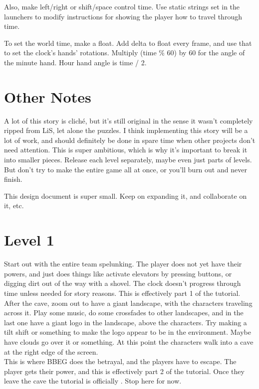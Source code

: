 \documentclass[a4paper,12pt]{article}
\begin{document}
  Also, make left/right or shift/space control time. Use static strings set in the launchers to modify instructions for showing the player how to travel through time.

  To set the world time, make a float. Add delta to float every frame, and use that to set the clock's hands' rotations. Multiply (time \% 60) by 60 for the angle of the minute hand. Hour hand angle is time / 2.

  \section{Other Notes}
  A lot of this story is clich\'e, but it's still original in the sense it wasn't completely ripped from LiS, let alone the puzzles. I think implementing this story will be a lot of work, and should definitely be done in spare time when other projects don't need attention. This is super ambitious, which is why it's important to break it into smaller pieces. Release each level separately, maybe even just parts of levels. But don't try to make the entire game all at once, or you'll burn out and never finish.

  This design document is super small. Keep on expanding it, and collaborate on it, etc.

  \section{Level 1}
  Start out with the entire team spelunking. The player does not yet have their powers, and just does things like activate elevators by pressing buttons, or digging dirt out of the way with a shovel. The clock doesn't progress through time unless needed for story reasons. This is effectively part 1 of the tutorial.\\

  After  the cave, zoom out to have a giant landscape, with the characters traveling across it. Play some music, do some crossfades to other landscapes, and in the last one have a giant logo in the landscape, above the characters. Try making a tilt shift or something to make the logo appear to be in the environment. Maybe have clouds go over it or something. At this point the characters walk into a cave at the right edge of the screen.\\

  This is where BBEG does the betrayal, and the players have to escape. The player gets their power, and this is effectively part 2 of the tutorial. Once they leave the cave the tutorial is officially . Stop here for now.
\end{document}
